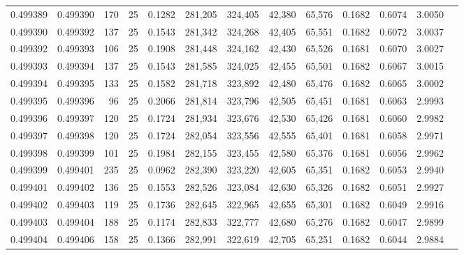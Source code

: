 \begin{tabular}{rrrrrrrrrrrrr}
0.499389 & 0.499390 & 170 &  25 &                                     0.1282 & 281,205 & 324,405 &  42,380 &  65,576 & 0.1682 & 0.6074 & 3.0050 \\
0.499390 & 0.499392 & 137 &  25 &                                     0.1543 & 281,342 & 324,268 &  42,405 &  65,551 & 0.1682 & 0.6072 & 3.0037 \\
0.499392 & 0.499393 & 106 &  25 &                                     0.1908 & 281,448 & 324,162 &  42,430 &  65,526 & 0.1681 & 0.6070 & 3.0027 \\
0.499393 & 0.499394 & 137 &  25 &                                     0.1543 & 281,585 & 324,025 &  42,455 &  65,501 & 0.1682 & 0.6067 & 3.0015 \\
0.499394 & 0.499395 & 133 &  25 &                                     0.1582 & 281,718 & 323,892 &  42,480 &  65,476 & 0.1682 & 0.6065 & 3.0002 \\
0.499395 & 0.499396 &  96 &  25 &                                     0.2066 & 281,814 & 323,796 &  42,505 &  65,451 & 0.1681 & 0.6063 & 2.9993 \\
0.499396 & 0.499397 & 120 &  25 &                                     0.1724 & 281,934 & 323,676 &  42,530 &  65,426 & 0.1681 & 0.6060 & 2.9982 \\
0.499397 & 0.499398 & 120 &  25 &                                     0.1724 & 282,054 & 323,556 &  42,555 &  65,401 & 0.1681 & 0.6058 & 2.9971 \\
0.499398 & 0.499399 & 101 &  25 &                                     0.1984 & 282,155 & 323,455 &  42,580 &  65,376 & 0.1681 & 0.6056 & 2.9962 \\
0.499399 & 0.499401 & 235 &  25 &                                     0.0962 & 282,390 & 323,220 &  42,605 &  65,351 & 0.1682 & 0.6053 & 2.9940 \\
0.499401 & 0.499402 & 136 &  25 &                                     0.1553 & 282,526 & 323,084 &  42,630 &  65,326 & 0.1682 & 0.6051 & 2.9927 \\
0.499402 & 0.499403 & 119 &  25 &                                     0.1736 & 282,645 & 322,965 &  42,655 &  65,301 & 0.1682 & 0.6049 & 2.9916 \\
0.499403 & 0.499404 & 188 &  25 &                                     0.1174 & 282,833 & 322,777 &  42,680 &  65,276 & 0.1682 & 0.6047 & 2.9899 \\
0.499404 & 0.499406 & 158 &  25 &                                     0.1366 & 282,991 & 322,619 &  42,705 &  65,251 & 0.1682 & 0.6044 & 2.9884 \\

\end{tabular}
